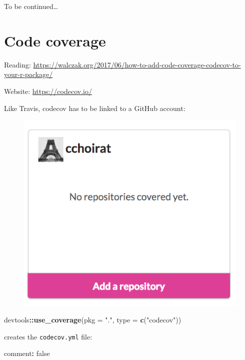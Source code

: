 \documentclass[]{book}
\newenvironment{Shaded}{\begin{snugshade}}{\end{snugshade}}
\newcommand{\KeywordTok}[1]{\textcolor[rgb]{0.13,0.29,0.53}{\textbf{#1}}}
\newcommand{\DataTypeTok}[1]{\textcolor[rgb]{0.13,0.29,0.53}{#1}}
\newcommand{\StringTok}[1]{\textcolor[rgb]{0.31,0.60,0.02}{#1}}
\newcommand{\OperatorTok}[1]{\textcolor[rgb]{0.81,0.36,0.00}{\textbf{#1}}}
\newcommand{\NormalTok}[1]{#1}
\theoremstyle{definition}
\theoremstyle{definition}
\theoremstyle{definition}
\theoremstyle{remark}
\begin{document}
To be continued\ldots{}

\section{Code coverage}\label{code-coverage}

Reading:
\url{https://walczak.org/2017/06/how-to-add-code-coverage-codecov-to-your-r-package/}

Website: \url{https://codecov.io/}

Like Travis, codecov has to be linked to a GitHub account:

\begin{figure}

{\centering \includegraphics{images/ch3_codecov_github} 

}

\end{figure}

\begin{Shaded}
\begin{Highlighting}[]
\NormalTok{devtools}\OperatorTok{::}\KeywordTok{use_coverage}\NormalTok{(}\DataTypeTok{pkg =} \StringTok{"."}\NormalTok{, }\DataTypeTok{type =} \KeywordTok{c}\NormalTok{(}\StringTok{"codecov"}\NormalTok{))}
\end{Highlighting}
\end{Shaded}

creates the \texttt{codecov.yml} file:

\begin{Shaded}
\begin{Highlighting}[]
\NormalTok{comment}\OperatorTok{:}\StringTok{ }\NormalTok{false}
\end{Highlighting}
\end{Shaded}
\end{document}
